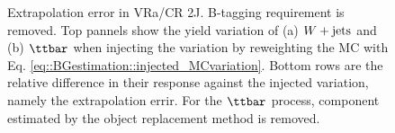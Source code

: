 \begin{figure}[h]
 \caption{Extrapolation error in VRa/CR 2J. B-tagging requirement is removed. Top pannels show the yield variation of (a) $W+\mathrm{jets}$ and (b) $\ttbar$ when injecting the variation by reweighting the MC with Eq. \ref{eq::BGestimation::injected_MCvariation}. Bottom rows are the relative difference in their response against the injected variation, namely the extrapolation errir. For the $\ttbar$ process, component estimated by the object replacement method is removed.  \label{fig::BGestimation::valid_extp_VRa2J} }
\end{figure}



